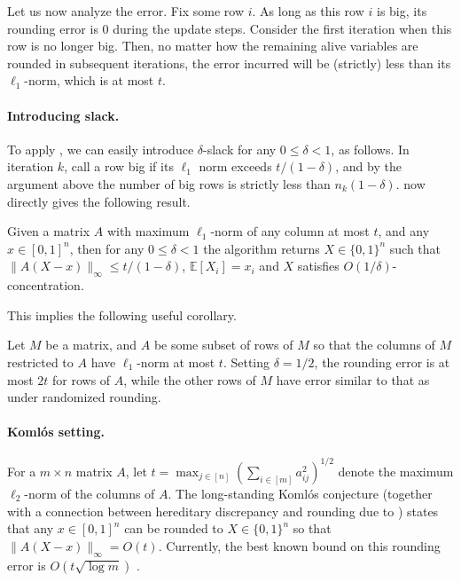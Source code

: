 \documentclass{toc}
\newcommand{\E}{\mathbb{E}}
\begin{document}
Let us now analyze the error. Fix some row $i$. As long as this row $i$ is big, its rounding error is $0$ during the update steps. Consider the first iteration when this row is no longer big. Then, no matter how the remaining alive variables are rounded in subsequent iterations, the error incurred will be (strictly) less than its $\ell_1$-norm, which is at most $t$.
\paragraph{Introducing slack.} To apply , we can easily introduce $\delta$-slack for any $0 \leq \delta < 1$, as follows. In iteration $k$, call a row big if its $\ell_1$ norm exceeds $t/(1-\delta)$,
and by the argument above the number of big rows is strictly less than $n_k(1-\delta)$. 
 now directly gives the following result.

\begin{theorem}
\label{thm:bf} Given a matrix $A$ with maximum  $\ell_1$-norm of any column at most $t$, and any $x\in [0,1]^n$, then for any $0\leq \delta < 1$ the algorithm returns $X\in \{0,1\}^n$ such that $\|A(X-x)\|_\infty \leq t/(1-\delta)$, $\E[X_i]=x_i$ and $X$ satisfies $O(1/\delta)$-concentration.
\end{theorem}

This implies the following useful corollary.
\begin{corollary} Let $M$ be a matrix, and $A$ be some subset of rows of $M$ so that the columns of $M$ restricted to $A$ have $\ell_1$-norm at most $t$. Setting $\delta=1/2$, the rounding error is at most $2t$ for rows of $A$, while the other rows of $M$ have error similar to that as under randomized rounding.
\end{corollary}
\paragraph{Koml\'{o}s setting.}
For a $m \times n$ matrix $A$, let $t = \max_{j \in [n]} (\sum_{i\in [m]} a_{ij}^2)^{1/2}$ denote the maximum $\ell_2$-norm of the columns of  $A$.
%
The long-standing Koml\'{o}s conjecture (together with a connection between hereditary discrepancy and rounding due to \cite{LSV86}) states that any $x \in [0,1]^n$ can be rounded to $X \in \{0,1\}^n$ so that $\|A(X-x)\|_\infty = O(t)$.
Currently, the best known bound on this rounding error is $O(t \sqrt{\log m})$ \cite{Bana98,BDG16}.

\smallskip
\end{document}
